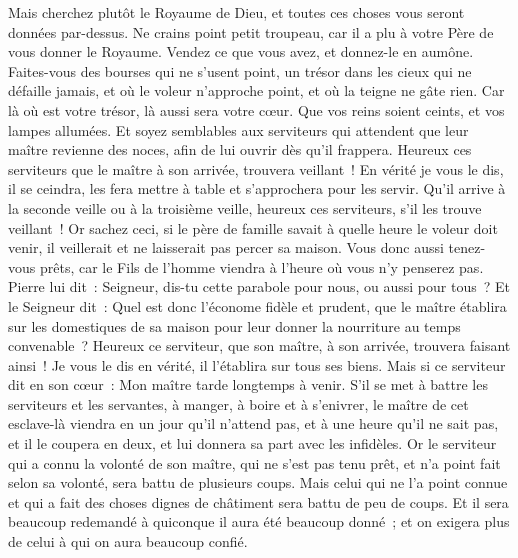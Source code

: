 \begin{multicols}{2}
Mais cherchez plutôt le Royaume de Dieu, et toutes ces choses vous seront données par-dessus.
Ne crains point petit troupeau, car il a plu à votre Père de vous donner le Royaume.
Vendez ce que vous avez, et donnez-le en aumône. Faites-vous des bourses qui ne s'usent point, un trésor dans les cieux qui ne défaille jamais, et où le voleur n'approche point, et où la teigne ne gâte rien.
Car là où est votre trésor, là aussi sera votre cœur.
Que vos reins soient ceints, et vos lampes allumées.
Et soyez semblables aux serviteurs qui attendent que leur maître revienne des noces, afin de lui ouvrir dès qu'il frappera.
Heureux ces serviteurs que le maître à son arrivée, trouvera veillant~! En vérité je vous le dis, il se ceindra, les fera mettre à table et s'approchera pour les servir.
Qu'il arrive à la seconde veille ou à la troisième veille, heureux ces serviteurs, s'il les trouve veillant~!
Or sachez ceci, si le père de famille savait à quelle heure le voleur doit venir, il veillerait et ne laisserait pas percer sa maison.
Vous donc aussi tenez-vous prêts, car le Fils de l'homme viendra à l'heure où vous n'y penserez pas.
Pierre lui dit~: Seigneur, dis-tu cette parabole pour nous, ou aussi pour tous~?
Et le Seigneur dit~: Quel est donc l'économe fidèle et prudent, que le maître établira sur les domestiques de sa maison pour leur donner la nourriture au temps convenable~?
Heureux ce serviteur, que son maître, à son arrivée, trouvera faisant ainsi~!
Je vous le dis en vérité, il l'établira sur tous ses biens.
Mais si ce serviteur dit en son cœur~: Mon maître tarde longtemps à venir. S'il se met à battre les serviteurs et les servantes, à manger, à boire et à s'enivrer,
le maître de cet esclave-là viendra en un jour qu'il n'attend pas, et à une heure qu'il ne sait pas, et il le coupera en deux, et lui donnera sa part avec les infidèles.
Or le serviteur qui a connu la volonté de son maître, qui ne s'est pas tenu prêt, et n'a point fait selon sa volonté, sera battu de plusieurs coups.
 Mais celui qui ne l'a point connue et qui a fait des choses dignes de châtiment sera battu de peu de coups. Et il sera beaucoup redemandé à quiconque il aura été beaucoup donné~; et on exigera plus de celui à qui on aura beaucoup confié.

\end{multicols}
